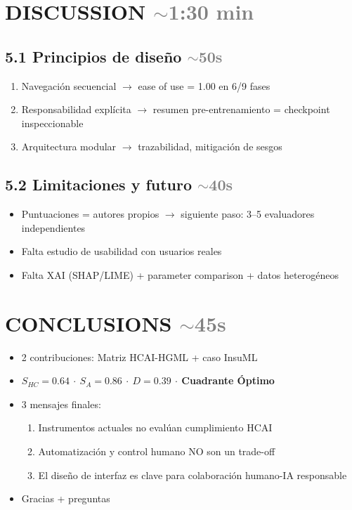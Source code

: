 \documentclass[10pt,a4paper]{article}
\newcommand{\tiempo}[1]{\hfill\normalfont\small\textcolor{gray}{$\sim$#1}}
\newcommand{\clave}[1]{\textbf{#1}}
\begin{document}
\section{DISCUSSION \tiempo{1:30 min}}

\subsection*{5.1 Principios de diseño \tiempo{50s}}
\begin{enumerate}
    \item Navegación secuencial $\rightarrow$ ease of use = 1.00 en 6/9 fases
    \item Responsabilidad explícita $\rightarrow$ resumen pre-entrenamiento = checkpoint inspeccionable
    \item Arquitectura modular $\rightarrow$ trazabilidad, mitigación de sesgos
\end{enumerate}

\subsection*{5.2 Limitaciones y futuro \tiempo{40s}}
\begin{itemize}
    \item Puntuaciones = autores propios $\rightarrow$ siguiente paso: 3--5 evaluadores independientes
    \item Falta estudio de usabilidad con usuarios reales
    \item Falta XAI (SHAP/LIME) + parameter comparison + datos heterogéneos
\end{itemize}

\section{CONCLUSIONS \tiempo{45s}}
\begin{itemize}
    \item 2 contribuciones: Matriz HCAI-HGML + caso InsuML
    \item \clave{$S_{HC}=0.64$ $\cdot$ $S_A=0.86$ $\cdot$ $D=0.39$ $\cdot$ Cuadrante Óptimo}
    \item 3 mensajes finales:
    \begin{enumerate}
        \item Instrumentos actuales no evalúan cumplimiento HCAI
        \item Automatización y control humano NO son un trade-off
        \item El diseño de interfaz es clave para colaboración humano-IA responsable
    \end{enumerate}
    \item Gracias + preguntas
\end{itemize}
\end{document}
